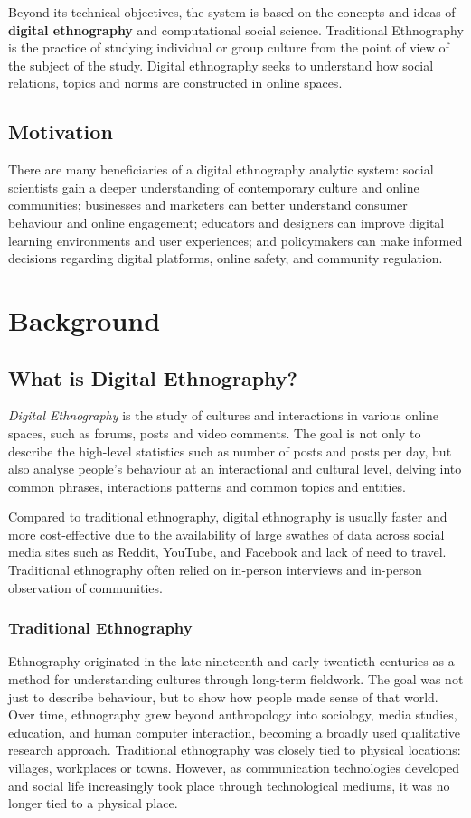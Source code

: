\documentclass[12pt, a4paper]{article}
\begin{document}
\vspace{0.5cm}
Beyond its technical objectives, the system is based on the concepts and ideas of \textbf{digital ethnography} and computational social science. Traditional Ethnography is the practice of studying individual or group culture from the point of view of the subject of the study. Digital ethnography seeks to understand how social relations, topics and norms are constructed in online spaces.

\subsection{Motivation}
There are many beneficiaries of a digital ethnography analytic system: social scientists gain a deeper understanding of contemporary culture and online communities; businesses and marketers can better understand consumer behaviour and online engagement; educators and designers can improve digital learning environments and user experiences; and policymakers can make informed decisions regarding digital platforms, online safety, and community regulation.

\newpage
\section{Background}
\subsection{What is Digital Ethnography?}
\textit{Digital Ethnography} is the study of cultures and interactions in various online spaces, such as forums, posts and video comments. The goal is not only to describe the high-level statistics such as number of posts and posts per day, but also analyse people's behaviour at an interactional and cultural level, delving into common phrases, interactions patterns and common topics and entities.

Compared to traditional ethnography, digital ethnography is usually faster and more cost-effective due to the availability of large swathes of data across social media sites such as Reddit, YouTube, and Facebook and lack of need to travel. Traditional ethnography often relied on in-person interviews and in-person observation of communities. \cite{coleman2010ethnographic}

\subsubsection{Traditional Ethnography}
Ethnography originated in the late nineteenth and early twentieth centuries as a method for understanding cultures through long-term fieldwork. The goal was not just to describe behaviour, but to show how people made sense of that world. Over time, ethnography grew beyond anthropology into sociology, media studies, education, and human computer interaction, becoming a broadly used qualitative research approach. Traditional ethnography was closely tied to physical locations: villages, workplaces or towns. However, as communication technologies developed and social life increasingly took place through technological mediums, it was no longer tied to a physical place.
\end{document}
